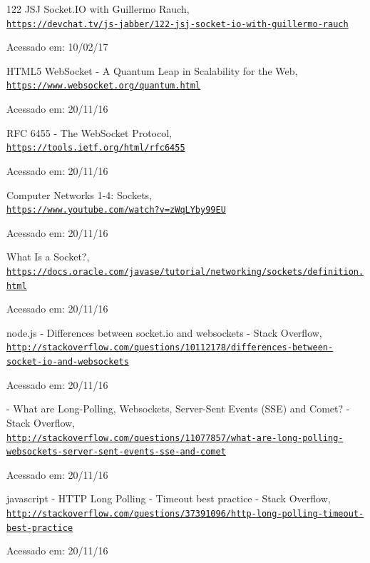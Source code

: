 \documentclass[a4paper,12pt]{article}
\begin{document}
\begin{thebibliography}{50}

122 JSJ Socket.IO with Guillermo Rauch,
\\\texttt{\url{https://devchat.tv/js-jabber/122-jsj-socket-io-with-guillermo-rauch
}}

Acessado em: 10/02/17

HTML5 WebSocket - A Quantum Leap in Scalability for the Web,
\\\texttt{\url{https://www.websocket.org/quantum.html}}

Acessado em: 20/11/16


RFC 6455 - The WebSocket Protocol,
\\\texttt{\url{https://tools.ietf.org/html/rfc6455}}

Acessado em: 20/11/16


Computer Networks 1-4: Sockets,
\\\texttt{\url{https://www.youtube.com/watch?v=zWqLYby99EU}}

Acessado em: 20/11/16


What Is a Socket?,
\\\texttt{\url{https://docs.oracle.com/javase/tutorial/networking/sockets/definition.html}}

Acessado em: 20/11/16


node.js - Differences between socket.io and websockets - Stack Overflow,
\\\texttt{\url{http://stackoverflow.com/questions/10112178/differences-between-socket-io-and-websockets}}

Acessado em: 20/11/16


 - What are Long-Polling, Websockets, Server-Sent Events (SSE) and Comet? - Stack Overflow,
\\\texttt{\url{http://stackoverflow.com/questions/11077857/what-are-long-polling-websockets-server-sent-events-sse-and-comet}}

Acessado em: 20/11/16


javascript - HTTP Long Polling - Timeout best practice - Stack Overflow,
\\\texttt{\url{http://stackoverflow.com/questions/37391096/http-long-polling-timeout-best-practice}}

Acessado em: 20/11/16



\end{thebibliography}
\end{document}
